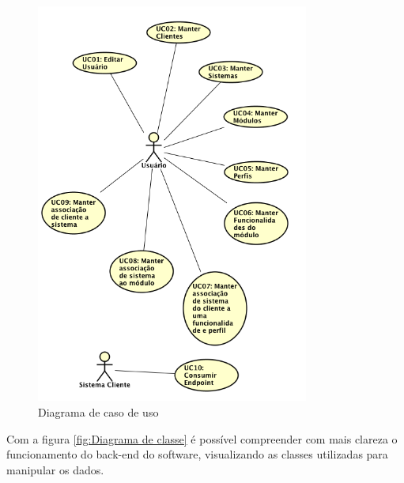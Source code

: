 \begin{figure}
	\includegraphics[width=0.8\textwidth]{images/Diagrama_de_caso_de_uso}
	\caption{Diagrama de caso de uso}
    \label{fig:Diagrama de caso de uso}
\end{figure}


Com a figura \ref{fig:Diagrama de classe} é possível compreender com mais clareza o funcionamento do back-end do software, visualizando as classes utilizadas para manipular os dados.


